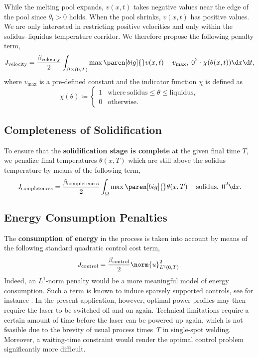 While the melting pool expands, $v(x,t)$ takes negative values near the edge of the pool since $\theta_t > 0$ holds.
When the pool shrinks, $v(x,t)$ has positive values.
We are only interested in restricting positive velocities and only within the solidus--liquidus temperature corridor.
We therefore propose the following penalty term,
\begin{equation} \label{eq:J_velocity}
	J_\textup{velocity} 
	= 
	\frac{\beta_\textup{velocity}}{2} \int_{\Omega \times (0,T)} \max \paren[big]\{\}{v(x,t) - v_{\max}, \; 0}^2 \cdot \chi(\theta(x,t)) \d x \d t
	,
\end{equation}
where $v_{\max}$ is a pre-defined constant and the indicator function $\chi$ is defined as
\begin{equation}
	\chi(\theta) 
	\coloneqq 
	\begin{cases}
		1 & \text{where}\ \text{solidus} \le \theta \le \text{liquidus}
		, 
		\\
		0 & \text{otherwise}
		.
	\end{cases}
\end{equation}


\subsection{Completeness of Solidification}

To ensure that the \textbf{solidification stage is complete} at the given final time $T$, we penalize final temperatures $\theta(x,T)$ which are still above the solidus temperature by means of the following term,
\begin{equation} \label{eq:J_completeness}
	J_\textup{completeness} 
	=
	\frac{\beta_\textup{completeness}}{2} \int_{\Omega} \max \paren[big]\{\}{\theta(x, T) - \text{solidus}, \; 0}^2 \d x
	.
\end{equation}


\subsection{Energy Consumption Penalties}

The \textbf{consumption of energy} in the process is taken into account by means of the following standard quadratic control cost term,
\begin{equation}
	J_\textup{control} 
	=
	\frac{\beta_\textup{control}}{2} \norm{u}^2_{L^2(0,T)}
	.
\end{equation}
Indeed, an $L^1$-norm penalty would be a more meaningful model of energy consumption.
Such a term is known to induce sparsely supported controls, see for instance \cite{VossenMaurer:2006:1,Stadler:2009:1,CasasHerzogWachsmuth:2012:2}.
In the present application, however, optimal power profiles may then require the laser to be switched off and on again.
Technical limitations require a certain amount of time before the laser can be powered up again, which is not feasible due to the brevity of usual process times~$T$ in single-spot welding.
Moreover, a waiting-time constraint would render the optimal control problem significantly more difficult.


